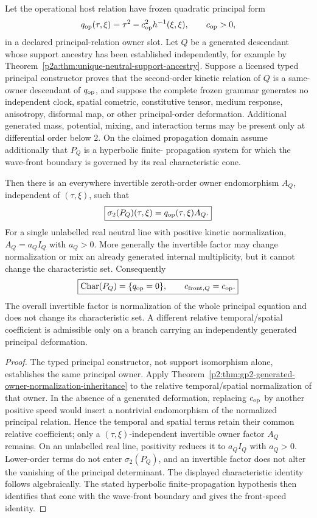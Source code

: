 \documentclass[12pt,a4paper]{article}
\begin{document}
\begin{theorem}
\label{p2a:thm:undeformed-host-principal-inheritance}
Let the operational host relation have frozen quadratic principal form
\[
 q_{\rm op}(\tau,\xi)
 =\tau^2-c_{\rm op}^2h^{-1}(\xi,\xi),
 \qquad c_{\rm op}>0,
\]
in a declared principal-relation owner slot.  Let \(Q\) be a generated
descendant whose support ancestry has been established independently, for
example by Theorem~\ref{p2a:thm:unique-neutral-support-ancestry}.  Suppose a
licensed typed principal constructor proves that the second-order kinetic
relation of
\(Q\) is a same-owner descendant of \(q_{\rm op}\), and suppose the complete
frozen grammar generates no independent clock, spatial cometric, constitutive
tensor, medium response, anisotropy, disformal map, or other principal-order
deformation.  Additional generated mass, potential, mixing, and interaction
terms may be present only at differential order below \(2\).  On the claimed
propagation domain assume additionally that \(P_Q\) is a hyperbolic finite-
propagation system for which the wave-front boundary is governed by its real
characteristic cone.

Then there is an everywhere invertible zeroth-order owner endomorphism
\(A_Q\), independent of \((\tau,\xi)\), such that
\[
 \boxed{
 \sigma_2(P_Q)(\tau,\xi)
 =q_{\rm op}(\tau,\xi)A_Q.}
\]
For a single unlabelled real neutral line with positive kinetic
normalization, \(A_Q=a_QI_Q\) with \(a_Q>0\).  More generally the invertible
factor may change normalization or mix an already generated internal
multiplicity, but it cannot change the characteristic set.
Consequently
\[
 \boxed{
 \operatorname{Char}(P_Q)=\{q_{\rm op}=0\},
 \qquad c_{{\rm front},Q}=c_{\rm op}.}
\]
The overall invertible factor is normalization of the whole principal
equation and does not change its characteristic set.  A different relative
temporal/spatial coefficient is admissible only on a branch carrying an
independently generated principal deformation.
\end{theorem}

\begin{proof}
The typed principal constructor, not support isomorphism alone, establishes the
same principal owner.  Apply
Theorem~\ref{p2:thm:gp2-generated-owner-normalization-inheritance} to the
relative temporal/spatial normalization of that owner.  In the absence of a
generated deformation, replacing \(c_{\rm op}\) by another positive speed
would insert a nontrivial endomorphism of the normalized principal relation.
Hence the temporal and spatial terms retain their common relative coefficient;
only a \((\tau,\xi)\)-independent invertible owner factor \(A_Q\) remains.
On an unlabelled real line, positivity reduces it to \(a_QI_Q\) with
\(a_Q>0\).  Lower-order terms do not enter \(\sigma_2(P_Q)\), and an
invertible factor does not alter the vanishing of the principal determinant.
The displayed characteristic identity follows algebraically.  The stated
hyperbolic finite-propagation hypothesis then identifies that cone with the
wave-front boundary and gives the front-speed identity.
\end{proof}
\end{document}
